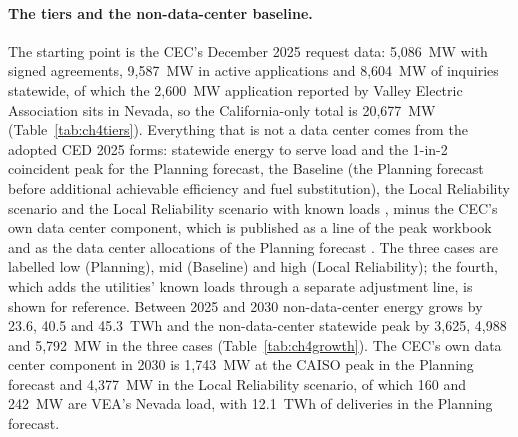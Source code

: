 \paragraph{The tiers and the non-data-center baseline.} The starting point is the CEC's December 2025 request data: 5,086~MW with signed agreements, 9,587~MW in active applications and 8,604~MW of inquiries statewide, of which the 2,600~MW application reported by Valley Electric Association sits in Nevada, so the California-only total is 20,677~MW (Table~\ref{tab:ch4tiers}). Everything that is not a data center comes from the adopted CED 2025 forms: statewide energy to serve load and the 1-in-2 coincident peak for the Planning forecast, the Baseline (the Planning forecast before additional achievable efficiency and fuel substitution), the Local Reliability scenario and the Local Reliability scenario with known loads \citep{cec_ced2025}, minus the CEC's own data center component, which is published as a line of the peak workbook and as the data center allocations of the Planning forecast \citep{ced2025_tables,cec_dc_memo2026}. The three cases are labelled low (Planning), mid (Baseline) and high (Local Reliability); the fourth, which adds the utilities' known loads through a separate adjustment line, is shown for reference. Between 2025 and 2030 non-data-center energy grows by 23.6, 40.5 and 45.3~TWh and the non-data-center statewide peak by 3,625, 4,988 and 5,792~MW in the three cases (Table~\ref{tab:ch4growth}). The CEC's own data center component in 2030 is 1,743~MW at the CAISO peak in the Planning forecast and 4,377~MW in the Local Reliability scenario, of which 160 and 242~MW are VEA's Nevada load, with 12.1~TWh of deliveries in the Planning forecast.

\begin{table}[H]
\centering\footnotesize
\caption{Requested capacity by tier, December 2025 vintage. Source: CEC Assembly hearing deck (statewide totals) and the methodology memo's Table 1 (VEA row).}
\label{tab:ch4tiers}

\end{table}

\begin{table}[H]
\centering\footnotesize
\caption{Non-data-center demand in 2025 and 2030 by IEPR case: statewide energy to serve load and coincident peak minus the CEC's data center component. Source: CED 2025 forms (TN 268722, 268727, 268725, 268726), peak components (TN 268124), data center allocations (TN 268824).}
\label{tab:ch4growth}
\resizebox{\textwidth}{!}{}
\end{table}


